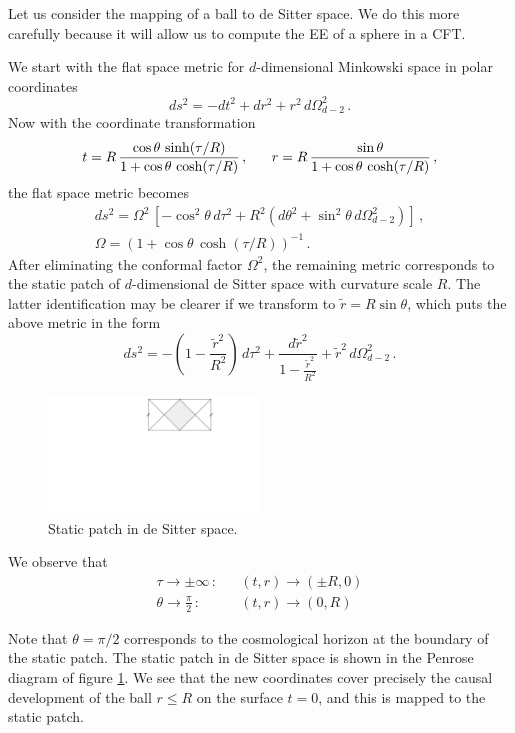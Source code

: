 \documentclass[12pt]{article}
\numberwithin{equation}{section}
\newcommand\eea{\end{eqnarray}}
\newcommand\bea{\begin{eqnarray}}
\def\beq{\begin{equation}}
\def\eeq{\end{equation}}
\newcommand{\be}{\begin{equation}}
\newcommand{\ee}{\end{equation}}
\begin{document}
Let us consider the mapping of a ball to de Sitter space. We do this more carefully because it will allow us to compute the EE of a sphere in a CFT. 
 
 We start
 with the flat space metric for $d$-dimensional Minkowski space in
polar coordinates
%
 \beq
ds^2=-dt^2+dr^2+r^2\,d\Omega^2_{d-2}\,.
 \label{flat1}
 \eeq
%
Now with the coordinate transformation
%
 \be
t=R\,\frac{\cos\theta\,\sinh(\tau/R)}{1+\cos\theta\,\cosh(\tau/R)}\,,\hspace{.6cm}
 \label{trn2}
%
r=R\,\frac{\sin\theta}{1+\cos\theta\,\cosh(\tau/R)}\,,
 \ee
%
 the flat space metric  becomes
%
 \begin{multline}
ds^2=\Omega^2\, \left[-\cos^2\!\theta\, d\tau^2+
R^2\left(d\theta^2+\sin^2\!\theta\,d\Omega^2_{d-2}\right)\right]\,,\\
 \label{round0}
%
\Omega=(1+\cos\theta\,\cosh(\tau/R))^{-1}\,.
\end{multline}
%
After eliminating the conformal factor $\Omega^2$, the remaining metric
corresponds to the static patch of $d$-dimensional de Sitter space with
curvature scale $R$. The latter identification may be clearer if we
transform to $\tilde{r}= R\sin\theta$, which puts the above metric in the
form
%
 \beq
ds^2=-\left(
1-\frac{\tilde{r}^2}{R^2}\right)\,d\tau^2+\frac{d \tilde{r}^2}{1-\frac{\tilde{r}^2}{R^2}}
+\tilde{r}^2\,d\Omega^2_{d-2}\,.
 \label{twor}
 \eeq
%
\begin{figure}[t]
\begin{center}  
\includegraphics[width=0.5\textwidth]{desitter.pdf}
\captionsetup{width=0.9\textwidth}
\caption{Static patch in de Sitter space. }
\label{ds}
\end{center}  
\end{figure}

We observe that
%
 \bea
\tau\rightarrow\pm\infty\,:&&(t,r)\rightarrow(\pm R,0)\label{junker9}\\
\theta\rightarrow\frac{\pi}{2}\,:&&(t,r)\rightarrow(0,R)\nonumber
 \eea
%

Note that $\theta=\pi/2$ corresponds to the cosmological horizon at the
boundary of the static patch. The static patch in de Sitter space is shown in the Penrose diagram of figure \ref{ds}. We
see that the new coordinates cover precisely the causal development of the ball $r\le R$ on the surface $t=0$, and this is mapped to the static patch. 
\end{document}

